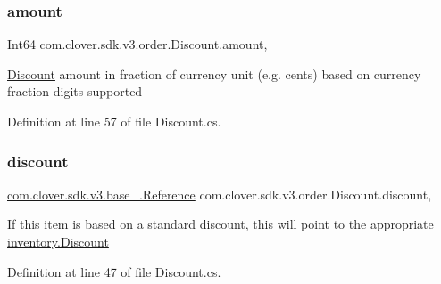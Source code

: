\subsubsection{\texorpdfstring{amount}{amount}}
{\footnotesize\ttfamily Int64 com.\+clover.\+sdk.\+v3.\+order.\+Discount.\+amount\hspace{0.3cm}{\ttfamily [get]}, {\ttfamily [set]}}



\hyperlink{classcom_1_1clover_1_1sdk_1_1v3_1_1order_1_1_discount}{Discount} amount in fraction of currency unit (e.\+g. cents) based on currency fraction digits supported 



Definition at line 57 of file Discount.\+cs.

\mbox{\label{classcom_1_1clover_1_1sdk_1_1v3_1_1order_1_1_discount_a6447f1e7eef9a5c388bf904b5cc1e8c8}} 
\subsubsection{\texorpdfstring{discount}{discount}}
{\footnotesize\ttfamily \hyperlink{classcom_1_1clover_1_1sdk_1_1v3_1_1base___1_1_reference}{com.\+clover.\+sdk.\+v3.\+base\+\_\+.\+Reference} com.\+clover.\+sdk.\+v3.\+order.\+Discount.\+discount\hspace{0.3cm}{\ttfamily [get]}, {\ttfamily [set]}}



If this item is based on a standard discount, this will point to the appropriate \hyperlink{classcom_1_1clover_1_1sdk_1_1v3_1_1inventory_1_1_discount}{inventory.\+Discount} 



Definition at line 47 of file Discount.\+cs.

\mbox{\label{classcom_1_1clover_1_1sdk_1_1v3_1_1order_1_1_discount_aa2c3e145ab182c1f49c2a6f865365981}} 
